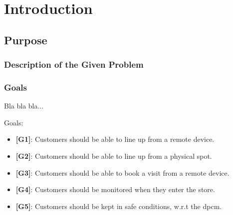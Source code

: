 \chapter{Introduction}

\section{Purpose}

\subsection{Description of the Given Problem}

\subsection{Goals}

Bla bla bla...

Goals:
\begin{itemize}
	\item {\textbf{[G1]}}: Customers should be able to line up from a remote device.
	\item {\textbf{[G2]}}: Customers should be able to line up from a physical spot.

	\item {\textbf{[G3]}}: Customers should be able to book a visit from a remote device.
	
	\item {\textbf{[G4]}}: Customers should be monitored when they enter the store.

	
	\item {\textbf{[G5]}}: Customers should be kept in safe conditions, w.r.t the \gls{dpcm}.
	
	
\end{itemize}

